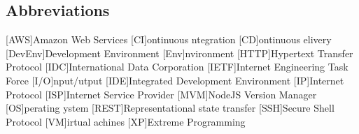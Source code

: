 \newcommand{\abbr}{Abbreviations}
\subsection{Abbreviations}

\begin{acronym}[1234567890]		%
\setlength{\itemsep}{-\parsep}	%
[AWS]{Amazon Web Services}
[CI]{ontinuous ntegration}
[CD]{ontinuous elivery}
[DevEnv]{Development Environment}
[Env]{nvironment}
[HTTP]{Hypertext Transfer Protocol}
[IDC]{International Data Corporation}
[IETF]{Internet Engineering Task Force}
[I/O]{nput/utput}
[IDE]{Integrated Development Environment }
[IP]{Internet Protocol}
[ISP]{Internet Service Provider}
[MVM]{NodeJS Version Manager}
[OS]{perating ystem}
[REST]{Representational state transfer}
[SSH]{Secure Shell Protocol}
[VM]{irtual achines}
[XP]{Extreme Programming}
\end{acronym}